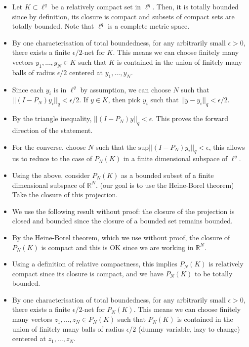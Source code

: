 \documentclass[10pt]{article}
\begin{document}
\begin{itemize}
    \item Let $K \subset \ell^q$ be a relatively compact set in $\ell^q$. Then, it is totally bounded since by definition, its closure is compact and subsets of compact sets are totally bounded. Note that $\ell^q$ is a complete metric space.
    \item By one characterisation of total boundedness, for any arbitrarily small $\epsilon > 0$, there exists a finite $\epsilon/2$-net for $K$. This means we can choose finitely many vectors $y_1, \dots, y_N \in K$ such that $K$ is contained in the union of finitely many balls of radius $\epsilon/2$ centered at $y_1, \dots, y_N$.
    \item Since each $y_i$ is in $\ell^q$ by assumption, we can choose $N$ such that $||(I - P_N)y_i||_q < \epsilon/2$.
    If $y \in K$, then pick $y_i$ such that $||y - y_i||_q < \epsilon/2$. 
    \item By the triangle inequality, $||(I-P_N)y||_q < \epsilon$. This proves the forward direction of the statement.
    \item For the converse, choose $N$ such that the $\mathrm{sup} ||(I - P_N)y_i||_q < \epsilon$, this allows us to reduce to the case of $P_N(K)$ in a finite dimensional subspace of $\ell^q$. 
    \item Using the above, consider $P_N(K)$ as a bounded subset of a finite dimensional subspace of $\mathbb{R}^N$. (our goal is to use the Heine-Borel theorem) Take the closure of this projection. 
    \item We use the following result without proof: the closure of the projection is closed and bounded since the closure of a bounded set remains bounded.
    \item By the Heine-Borel theorem, which we use without proof, the closure of $P_N(K)$ is compact and this is OK since we are working in $\mathbb{R}^N$.
    \item Using a definition of relative compactness, this implies $P_N(K)$ is relatively compact since its closure is compact, and we have $P_N(K)$ to be totally bounded.
    \item By one characterisation of total boundedness, for any arbitrarily small $\epsilon > 0$, there exists a finite $\epsilon/2$-net for $P_N(K)$. This means we can choose finitely many vectors $z_1, \dots, z_N \in P_N(K)$ such that $P_N(K)$ is contained in the union of finitely many balls of radius $\epsilon/2$ (dummy variable, lazy to change) centered at $z_1, \dots, z_N$.

\end{itemize}
\end{document}
